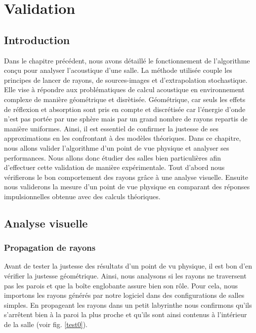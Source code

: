 \chapter{Validation}
	\minitoc
	\newpage
	
\section*{Introduction}

Dans le chapitre précédent, nous avons détaillé le fonctionnement de l'algorithme conçu pour analyser l'acoustique d'une salle. La méthode utilisée couple les principes de lancer de rayons, de sources-images et d'extrapolation stochastique. Elle vise à répondre aux problématiques de calcul acoustique en environnement complexe de manière géométrique et disrètisée. Géométrique, car seuls les effets de réflexion et absorption sont pris en compte et discrétisée car l'énergie d'onde n'est pas portée par une sphère mais par un grand nombre de rayons repartis de manière uniformes. Ainsi, il est essentiel de confirmer la justesse de ses approximations en les confrontant à des modèles théoriques. Dans ce chapitre, nous allons valider l'algorithme d'un point de vue physique et analyser ses performances. Nous allons donc étudier des salles bien particulières afin d'effectuer cette validation de manière expérimentale. Tout d'abord nous vérifierons le bon comportement des rayons grâce à une analyse visuelle. Ensuite nous validerons la mesure d'un point de vue physique en comparant des réponses impulsionnelles obtenue avec des calculs théoriques.

\section{Analyse visuelle}
\subsection{Propagation de rayons}

Avant de tester la justesse des résultats d'un point de vu physique, il est bon d'en vérifier la justesse géométrique. Ainsi, nous analysons si les rayons ne traversent pas les parois et que la boîte englobante assure bien son rôle. Pour cela, nous importons les rayons générés par notre logiciel dans des configurations de salles simples. En propageant les rayons dans un petit labyrinthe nous confirmons qu'ils s'arrêtent bien à la paroi la plus proche et qu'ils sont ainsi contenus à l'intérieur de la salle (voir fig. \ref{test0}). 


